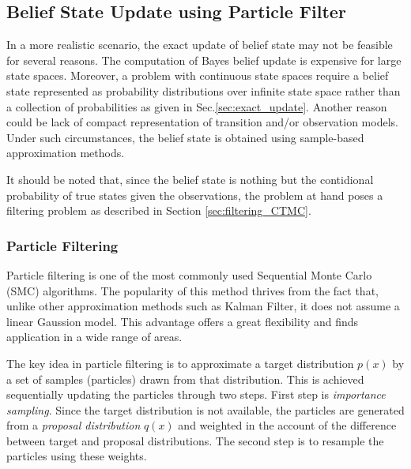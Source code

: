 \subsection{Belief State Update using Particle Filter}
In a more realistic scenario, the exact update of belief state may not be feasible for several reasons. The computation of Bayes belief update is expensive for large state spaces. Moreover, a problem with continuous state spaces require a belief state represented as probability distributions over infinite state space rather than a collection of probabilities as given in Sec.\ref{sec:exact_update}. \cite{Carlo1904} Another reason could be lack of compact representation of transition and/or observation models. Under such circumstances, the belief state is obtained using sample-based approximation methods. \cite{Carlo1904} 

It should be noted that, since the belief state is nothing but the contidional probability of true states given the observations, the problem at hand poses a filtering problem as described in Section \ref{sec:filtering_CTMC}.

\subsubsection{Particle Filtering}
Particle filtering is one of the most commonly used Sequential Monte Carlo (SMC) algorithms. The popularity of this method thrives from the fact that, unlike other approximation methods such as Kalman Filter, it does not assume a linear Gaussion model. This advantage offers a great flexibility and finds application in a wide range of areas.\cite{Doucet2009}

The key idea in particle filtering is to approximate a target distribution $ p(x) $ by a set of samples (particles) drawn from that distribution. This is achieved sequentially updating the particles through two steps. First step is \textit{importance sampling}. Since the target distribution is not available, the particles are generated from a \textit{proposal distribution} $ q(x) $ and weighted in the account of the difference between target and proposal distributions. The second step is to resample the particles using these weights. \cite{Godsill2019}

